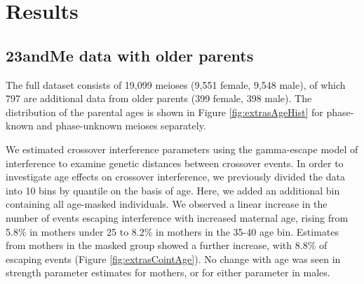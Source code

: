 \section{Results}
\subsection{23andMe data with older parents}

The full dataset consists of 19,099 meioses (9,551 female, 9,548 male), of which 797 are additional data from older parents (399 female, 398 male).
The distribution of the parental ages is shown in Figure \ref{fig:extrasAgeHist} for phase-known and phase-unknown meioses separately.

We estimated crossover interference parameters using the gamma-escape model of interference\cite{Housworth2003} to examine genetic distances between crossover events.
In order to investigate age effects on crossover interference, we previously divided the data into 10 bins by quantile on the basis of age.
Here, we added an additional bin containing all age-masked individuals.
We observed a linear increase in the number of events escaping interference with increased maternal age, rising from 5.8\% in mothers under 25 to 8.2\% in mothers in the 35-40 age bin.
Estimates from mothers in the masked group showed a further increase, with 8.8\% of escaping events (Figure \ref{fig:extrasCointAge}).
No change with age was seen in strength parameter estimates for mothers, or for either parameter in males.



